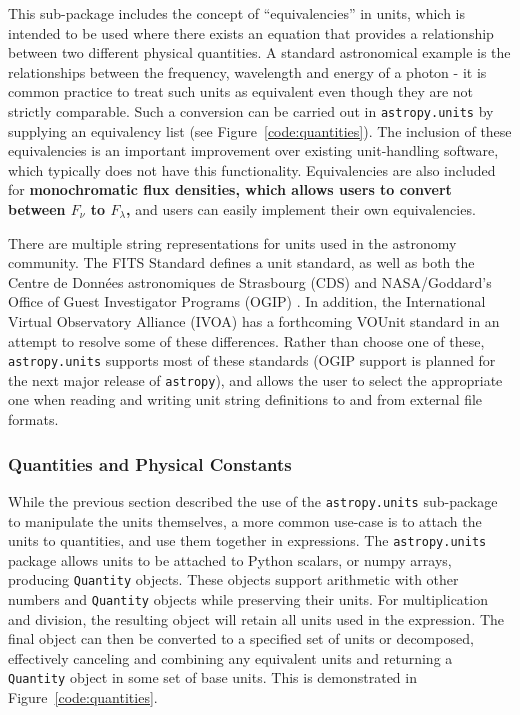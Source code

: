 \documentclass[traditabstract]{aa}
\newcommand{\astropy}{\texttt{astropy}\xspace}
\begin{document}
This sub-package includes the concept of ``equivalencies'' in units, which is
intended to be used where there exists an equation that provides a relationship
between two different physical quantities. A standard astronomical example is the
relationships between the frequency, wavelength and energy of a photon - it is
common practice to treat such units as equivalent even though they are not
strictly comparable. Such a conversion can be carried out in \texttt{astropy.units} by supplying an equivalency list
(see Figure~\ref{code:quantities}). The inclusion of these equivalencies is an important
improvement over existing unit-handling software, which typically does not
have this functionality. Equivalencies are also included for
\textbf{monochromatic flux densities, which allows users to convert between
$F_\nu$ to $F_\lambda$,} and users can easily implement their own
equivalencies.

There are multiple string representations for units used in the astronomy
community. The FITS Standard \citep{fits3} defines a unit standard, as well
as both the Centre de Donn\'ees astronomiques de Strasbourg (CDS)
\citep{ochsenbein2000cds} and NASA/Goddard's Office of Guest Investigator
Programs (OGIP) \citep{george1995ogip}. In addition, the International Virtual
Observatory Alliance (IVOA) has a forthcoming VOUnit standard
\citep{derriere2012vounit} in an attempt to resolve some of these differences.
Rather than choose one of these, \texttt{astropy.units} supports most of these
standards (OGIP support is planned for the next major release of \astropy),
and allows the user to select the appropriate one when reading and writing unit
string definitions to and from external file formats.

\subsubsection{Quantities and Physical Constants}

\label{sec:quantities}

While the previous section described the use of the \texttt{astropy.units} sub-package to manipulate
the units themselves, a more common use-case is to attach the units to
quantities, and use them together in expressions. The \texttt{astropy.units}
package allows units to be attached to Python scalars, or \gls{numpy} arrays,
producing \texttt{Quantity} objects. These objects support arithmetic with
other numbers and \texttt{Quantity} objects while preserving their units. For
multiplication and division, the resulting object will retain all units used in
the expression. The final object can then be converted to a specified set of
units or decomposed, effectively canceling and combining any equivalent units
and returning a \texttt{Quantity} object in some set of base units. This is
demonstrated in Figure~\ref{code:quantities}.
\end{document}
